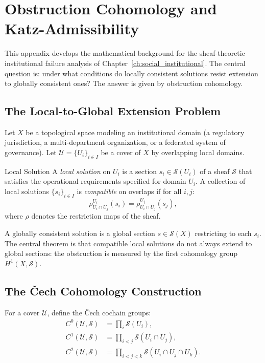 \chapter{Obstruction Cohomology and Katz-Admissibility}
\label{app:obstruction}

\noindent This appendix develops the mathematical background for the
sheaf-theoretic institutional failure analysis of
Chapter~\ref{ch:social_institutional}. The central question is: under what
conditions do locally consistent solutions resist extension to globally consistent
ones? The answer is given by obstruction cohomology.

\section{The Local-to-Global Extension Problem}

Let $X$ be a topological space modeling an institutional domain (a regulatory
jurisdiction, a multi-department organization, or a federated system of
governance). Let $\mathcal{U} = \{U_i\}_{i \in I}$ be a cover of $X$ by
overlapping local domains.

\begin{definition}{Local Solution}
A \emph{local solution} on $U_i$ is a section $s_i \in \mathcal{S}(U_i)$
of a sheaf $\mathcal{S}$ that satisfies the operational requirements
specified for domain $U_i$. A collection of local solutions $\{s_i\}_{i \in I}$
is \emph{compatible} on overlaps if for all $i, j$:
\[
  \rho^{U_i}_{U_i \cap U_j}(s_i) = \rho^{U_j}_{U_i \cap U_j}(s_j),
\]
where $\rho$ denotes the restriction maps of the sheaf.
\end{definition}

A globally consistent solution is a global section $s \in \mathcal{S}(X)$
restricting to each $s_i$. The central theorem is that compatible local solutions
do not always extend to global sections: the obstruction is measured by the
first cohomology group $H^1(X, \mathcal{S})$.

\section{The Čech Cohomology Construction}

For a cover $\mathcal{U}$, define the Čech cochain groups:
\begin{align}
  C^0(\mathcal{U}, \mathcal{S}) &= \prod_{i} \mathcal{S}(U_i), \\
  C^1(\mathcal{U}, \mathcal{S}) &= \prod_{i < j} \mathcal{S}(U_i \cap U_j), \\
  C^2(\mathcal{U}, \mathcal{S}) &= \prod_{i < j < k} \mathcal{S}(U_i \cap U_j \cap U_k).
\end{align}

